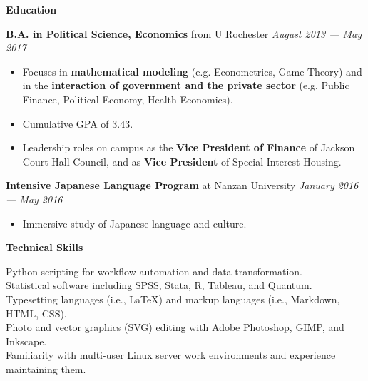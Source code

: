 \documentclass[12pt]{article}
\newenvironment{details}{
\begin{itemize}[label={}]
  \small \setlength{\itemsep}{0pt}
}{\end{itemize}}
\begin{document}
\vspace{.2in}
\large
\textbf{Education} \hrulefill

\vspace{.1in}
\normalsize
\textbf{B.A. in Political Science, Economics} from U Rochester \hfill \textit{August 2013 --- May 2017}
\begin{details}
  \item Focuses in \textbf{mathematical modeling} (e.g. Econometrics, Game Theory) and in the \textbf{interaction of government and the private sector} (e.g. Public Finance, Political Economy, Health Economics).
  \item Cumulative GPA of $3.43$.
  \item Leadership roles on campus as the \textbf{Vice President of Finance} of Jackson Court Hall Council, and as \textbf{Vice President} of Special Interest Housing.
\end{details}

\vspace{.1in}
\normalsize
\textbf{Intensive Japanese Language Program} at Nanzan University \hfill \textit{January 2016 --- May 2016}
\begin{details}
  \item Immersive study of Japanese language and culture. \\
\end{details}

\vspace{.2in}
\large
\textbf{Technical Skills} \hrulefill

\normalsize
\onehalfspacing
\begin{flushleft}
  Python scripting for workflow automation and data transformation. \\
  Statistical software including SPSS, Stata, R, Tableau, and Quantum. \\
  Typesetting languages (i.e., \LaTeX) and markup languages (i.e., Markdown, HTML, CSS). \\
  Photo and vector graphics (SVG) editing with Adobe Photoshop, GIMP, and Inkscape. \\
  Familiarity with multi-user Linux server work environments and experience maintaining them.
\end{flushleft}
\end{document}
